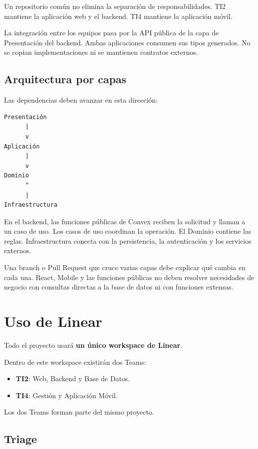 \documentclass[11pt,a4paper]{article}
\begin{document}
Un repositorio común no elimina la separación de responsabilidades. TI2
mantiene la aplicación web y el backend. TI4 mantiene la aplicación móvil.

La integración entre los equipos pasa por la API pública de la capa de
Presentación del backend. Ambas aplicaciones consumen sus tipos generados. No
se copian implementaciones ni se mantienen contratos externos.

\subsection{Arquitectura por capas}

Las dependencias deben avanzar en esta dirección:

\begin{lstlisting}
Presentación
      |
      v
Aplicación
      |
      v
Dominio
      ^
      |
Infraestructura
\end{lstlisting}

En el backend, las funciones públicas de Convex reciben la solicitud y llaman
a un caso de uso. Los casos de uso coordinan la operación. El Dominio contiene
las reglas. Infraestructura conecta con la persistencia, la autenticación y los
servicios externos.

Una branch o Pull Request que cruce varias capas debe explicar qué cambia en
cada una. React, Mobile y las funciones públicas no deben resolver necesidades
de negocio con consultas directas a la base de datos ni con funciones extensas.


\section{Uso de Linear}

Todo el proyecto usará \textbf{un único workspace de Linear}.

Dentro de este workspace existirán dos Teams:

\begin{itemize}
  \item \textbf{TI2}: Web, Backend y Base de Datos.
  \item \textbf{TI4}: Gestión y Aplicación Móvil.
\end{itemize}

Los dos Teams forman parte del mismo proyecto.

\subsection{Triage}
\end{document}
